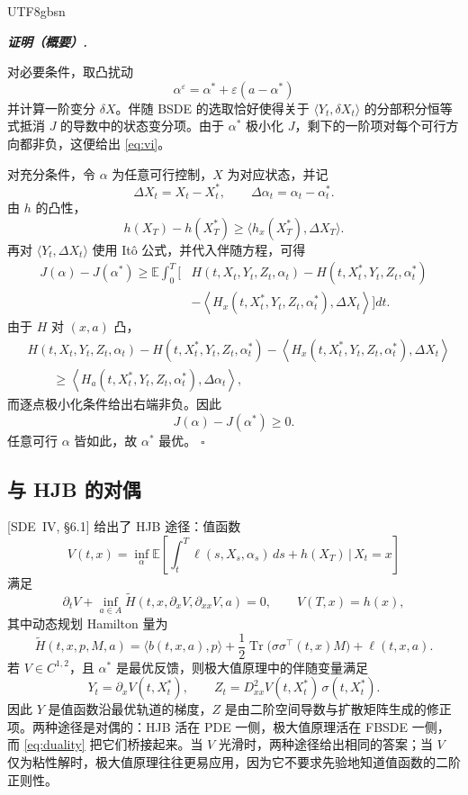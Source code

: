 \documentclass{article}
\newenvironment{proof}[1][证明]{%
  \par\smallskip\noindent\textit{\textbf{#1.}}\quad\ignorespaces
}{%
  \hfill$\square$\par\smallskip
}
\theoremstyle{plain}
\theoremstyle{definition}
\theoremstyle{remark}
\numberwithin{equation}{section}
\newcommand{\E}{\mathbb{E}}
\begin{document}
\begin{CJK*}{UTF8}{gbsn}
\begin{proof}[证明（概要）]
对必要条件，取凸扰动
\[
  \alpha^\varepsilon=\alpha^*+\varepsilon(a-\alpha^*)
\]
并计算一阶变分 $\delta X$。伴随 BSDE 的选取恰好使得关于 $\langle Y_t,\delta X_t\rangle$ 的分部积分恒等式抵消 $J$ 的导数中的状态变分项。由于 $\alpha^*$ 极小化 $J$，剩下的一阶项对每个可行方向都非负，这便给出 \eqref{eq:vi}。

对充分条件，令 $\alpha$ 为任意可行控制，$X$ 为对应状态，并记
\[
  \Delta X_t=X_t-X_t^*,\qquad \Delta\alpha_t=\alpha_t-\alpha_t^*.
\]
由 $h$ 的凸性，
\[
  h(X_T)-h(X_T^*)\ge\langle h_x(X_T^*),\Delta X_T\rangle.
\]
再对 $\langle Y_t,\Delta X_t\rangle$ 使用 It\^o 公式，并代入伴随方程，可得
\[
\begin{aligned}
  J(\alpha)-J(\alpha^*)\ge\E\int_0^T\Big[&H(t,X_t,Y_t,Z_t,\alpha_t)-H(t,X_t^*,Y_t,Z_t,\alpha_t^*)\\
  &-\left\langle H_x(t,X_t^*,Y_t,Z_t,\alpha_t^*),\Delta X_t\right\rangle\Big]dt.
\end{aligned}
\]
由于 $H$ 对 $(x,a)$ 凸，
\[
\begin{aligned}
  &H(t,X_t,Y_t,Z_t,\alpha_t)-H(t,X_t^*,Y_t,Z_t,\alpha_t^*)-\left\langle H_x(t,X_t^*,Y_t,Z_t,\alpha_t^*),\Delta X_t\right\rangle\\
  &\qquad\ge\left\langle H_a(t,X_t^*,Y_t,Z_t,\alpha_t^*),\Delta\alpha_t\right\rangle,
\end{aligned}
\]
而逐点极小化条件给出右端非负。因此
\[
  J(\alpha)-J(\alpha^*)\ge 0.
\]
任意可行 $\alpha$ 皆如此，故 $\alpha^*$ 最优。
\end{proof}

\subsection{与 HJB 的对偶}

[SDE~IV, \S6.1] 给出了 HJB 途径：值函数
\[
  V(t,x)=\inf_\alpha\E\left[\int_t^T\ell(s,X_s,\alpha_s)\,ds+h(X_T)\,\Big|\,X_t=x\right]
\]
满足
\[
  \partial_tV+\inf_{a\in A}\tilde H(t,x,\partial_xV,\partial_{xx}V,a)=0,\qquad V(T,x)=h(x),
\]
其中动态规划 Hamilton 量为
\[
  \tilde H(t,x,p,M,a)=\langle b(t,x,a),p\rangle+\frac12\operatorname{Tr}\bigl(\sigma\sigma^\top(t,x)M\bigr)+\ell(t,x,a).
\]
若 $V\in C^{1,2}$，且 $\alpha^*$ 是最优反馈，则极大值原理中的伴随变量满足
\begin{equation}\label{eq:duality}
  Y_t=\partial_xV(t,X_t^*),\qquad Z_t=D^2_{xx}V(t,X_t^*)\,\sigma(t,X_t^*).
\end{equation}
因此 $Y$ 是值函数沿最优轨道的梯度，$Z$ 是由二阶空间导数与扩散矩阵生成的修正项。两种途径是对偶的：HJB 活在 PDE 一侧，极大值原理活在 FBSDE 一侧，而 \eqref{eq:duality} 把它们桥接起来。当 $V$ 光滑时，两种途径给出相同的答案；当 $V$ 仅为粘性解时，极大值原理往往更易应用，因为它不要求先验地知道值函数的二阶正则性。


\end{CJK*}
\end{document}
